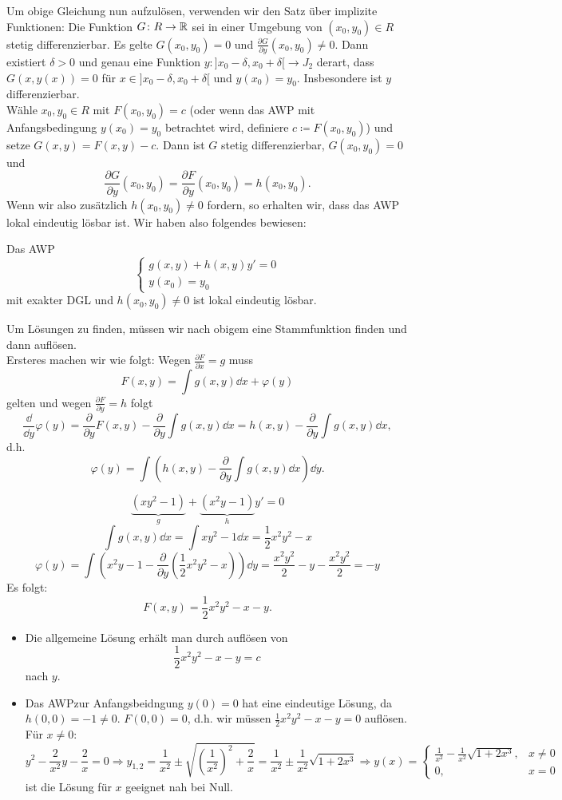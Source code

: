 Um obige Gleichung nun aufzul\"osen, verwenden wir den Satz \"uber implizite Funktionen: Die Funktion $ G\colon R\rightarrow\mathbb{R} $ sei in einer Umgebung von $ (x_0,y_0)\in R $ stetig differenzierbar. Es gelte $ G(x_0,y_0)=0 $ und $ \frac{\partial G}{\partial y}(x_0,y_0)\neq  0 $. Dann existiert $ \delta>0 $ und genau eine Funktion $ y\colon ]x_0-\delta,x_0+\delta[\rightarrow J_2 $ derart, dass $ G(x,y(x))=0 $ f\"ur $ x\in]x_0-\delta, x_0+\delta[ $ und $ y(x_0)=y_0 $. Insbesondere ist $ y $ differenzierbar.\\
W\"ahle $ x_0,y_0\in R $ mit $ F(x_0,y_0)=c $ (oder wenn das AWP mit Anfangsbedingung $ y(x_0)=y_0 $ betrachtet wird, definiere $ c\coloneqq F(x_0,y_0) $) und setze $ G(x,y)=F(x,y)-c $. Dann ist $ G $ stetig differenzierbar, $ G(x_0,y_0)=0 $ und
\[ \frac{\partial G}{\partial y}(x_0,y_0)=\frac{\partial F}{\partial y}(x_0,y_0)=h(x_0,y_0). \]
Wenn wir also zus\"atzlich $ h(x_0,y_0)\neq 0 $ fordern, so erhalten wir, dass das AWP lokal eindeutig l\"osbar ist. Wir haben also folgendes bewiesen:
\begin{satz}
	Das AWP
	\[ \begin{cases}
	g(x,y)+h(x,y)y'=0\\
	y(x_0)=y_0
	\end{cases} \]
	mit exakter DGL und $ h(x_0,y_0)\neq 0 $ ist lokal eindeutig l\"osbar.
\end{satz}
Um L\"osungen zu finden, m\"ussen wir nach obigem eine Stammfunktion finden und dann aufl\"osen.\\
Ersteres machen wir wie folgt: Wegen $ \frac{\partial F}{\partial x}=g $ muss
\[ F(x,y)=\int g(x,y)\dd x+ \varphi(y) \]
gelten und wegen $ \frac{\partial F}{\partial y}=h $ folgt
\[ \frac{\dd }{\dd y}\varphi(y)=\frac{\partial}{\partial y}F(x,y)-\frac{\partial}{\partial y}\int g(x,y)\dd x=h(x,y)-\frac{\partial}{\partial y}\int g(x,y)\dd x, \]
d.h.
\[ \varphi(y)=\int\left( h(x,y)-\frac{\partial}{\partial y}\int g(x,y)\dd x\right)\dd y. \]
\begin{beispiel}
	\[ \underbrace{(xy^2-1)}_{g}+\underbrace{(x^2y-1)}_{h}y'=0 \]
	\[ \int g(x,y)\dd x=\int xy^2-1\dd x=\frac{1}{2}x^2y^2-x \]
	\[ \varphi(y)=\int\left(x^2y-1-\frac{\partial}{\partial y}\left(\frac{1}{2}x^2y^2-x\right)\right)\dd y=\frac{x^2y^2}{2}-y-\frac{x^2y^2}{2}=-y \]
	Es folgt:
	\[ F(x,y)=\frac{1}{2}x^2y^2-x-y. \]
	\begin{itemize}
		\item Die allgemeine L\"osung erh\"alt man durch aufl\"osen von
		\[ \frac{1}{2}x^2y^2-x-y=c \]
	    nach $ y $.
	    \item Das AWPzur Anfangsbeidngung $ y(0)=0 $ hat eine eindeutige L\"osung, da $ h(0,0)=-1\neq 0 $. $ F(0,0)=0 $, d.h. wir m\"ussen $ \frac{1}{2}x^2y^2-x-y=0 $ aufl\"osen. F\"ur $ x\neq 0 $:
	    \[ y^2-\frac{2}{x^2}y-\frac{2}{x}=0\Rightarrow y_{1,2}=\frac{1}{x^2}\pm\sqrt{\left(\frac{1}{x^2}\right)^2+\frac{2}{x}}=\frac{1}{x^2}\pm\frac{1}{x^2}\sqrt{1+2x^3}\Rightarrow y(x)=\begin{cases}
	    \frac{1}{x^2}-\frac{1}{x^2}\sqrt{1+2x^3},&x\neq 0\\
	    0,&x=0
	    \end{cases} \]
	    ist die L\"osung f\"ur $ x $ geeignet nah bei Null.
	 \end{itemize}
\end{beispiel}
